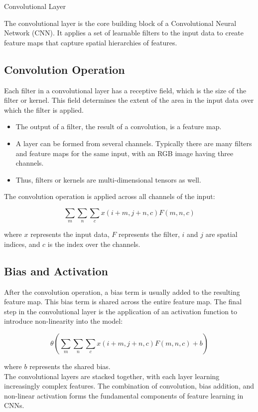 \begin{definitionbox}{Convolutional Layer}

The convolutional layer is the core building block of a Convolutional Neural Network (CNN). It applies a set of learnable filters to the input data to create feature maps that capture spatial hierarchies of features.

\subsection{Convolution Operation}

Each filter in a convolutional layer has a receptive field, which is the size of the filter or kernel. This field determines the extent of the area in the input data over which the filter is applied.

\begin{itemize}
    \item The output of a filter, the result of a convolution, is a feature map.
    \item A layer can be formed from several channels. Typically there are many filters and feature maps for the same input, with an RGB image having three channels.
    \item Thus, filters or kernels are multi-dimensional tensors as well.
\end{itemize}

The convolution operation is applied across all channels of the input:

\[
\sum_{m}\sum_{n}\sum_{c} x(i + m, j + n, c) F(m, n, c)
\]

where \( x \) represents the input data, \( F \) represents the filter, \( i \) and \( j \) are spatial indices, and \( c \) is the index over the channels.

\subsection{Bias and Activation}

After the convolution operation, a bias term is usually added to the resulting feature map. This bias term is shared across the entire feature map. The final step in the convolutional layer is the application of an activation function to introduce non-linearity into the model:

\[
\theta\left(\sum_{m}\sum_{n}\sum_{c} x(i + m, j + n, c) F(m, n, c) + b\right)
\]

where \( b \) represents the shared bias. \\

The convolutional layers are stacked together, with each layer learning increasingly complex features. The combination of convolution, bias addition, and non-linear activation forms the fundamental components of feature learning in CNNs.

\end{definitionbox}


